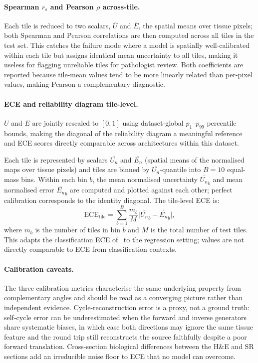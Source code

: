 \paragraph{Spearman $r_s$ and Pearson $\rho$ across-tile.}
Each tile is reduced to two scalars, $\overline{U}$ and $\overline{E}$, the
spatial means over tissue pixels; both Spearman and Pearson correlations are then
computed across all tiles in the test set.
This catches the failure mode where a model is spatially well-calibrated within each
tile but assigns identical mean uncertainty to all tiles, making it useless for
flagging unreliable tiles for pathologist review.
Both coefficients are reported because tile-mean values tend to be more linearly
related than per-pixel values, making Pearson a complementary diagnostic.

\paragraph{ECE and reliability diagram tile-level.}
$U$ and $E$ are jointly rescaled to $[0,1]$ using dataset-global $p_1$--$p_{99}$
percentile bounds, making the diagonal of the reliability diagram a meaningful
reference and ECE scores directly comparable across architectures within this
dataset.

Each tile is represented by scalars $\overline{U_n}$ and $\overline{E_n}$ (spatial
means of the normalised maps over tissue pixels) and tiles are binned by
$\overline{U_n}$-quantile into $B{=}10$ equal-mass bins.
Within each bin $b$, the mean normalised uncertainty $\overline{U_n}_b$ and mean
normalised error $\overline{E_n}_b$ are computed and plotted against each other;
perfect calibration corresponds to the identity diagonal.
The tile-level ECE is:
\begin{equation}
  \mathrm{ECE}_{\mathrm{tile}} = \sum_{b=1}^{B} \frac{m_b}{M}
    \bigl|\overline{U_n}_b - \overline{E_n}_b\bigr|,
\end{equation}
where $m_b$ is the number of tiles in bin $b$ and $M$ is the total number of test
tiles.
This adapts the classification ECE of~\cite{guo2017ece} to the regression setting;
values are not directly comparable to ECE from classification contexts.

\paragraph{Calibration caveats.}
The three calibration metrics characterise the same underlying property from
complementary angles and should be read as a converging picture rather than
independent evidence.
Cycle-reconstruction error is a proxy, not a ground truth: self-cycle error can be
underestimated when the forward and inverse generators share systematic biases, in
which case both directions may ignore the same tissue feature and the round trip
still reconstructs the source faithfully despite a poor forward translation.
Cross-section biological differences between the H\&E and SR sections add an
irreducible noise floor to ECE that no model can overcome.

